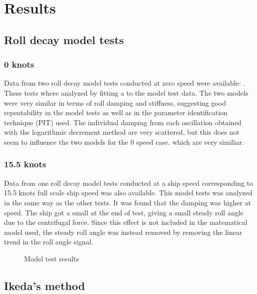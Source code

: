 \section{Results}\label{results}

    \subsection{Roll decay model tests}\label{roll-decay-model-tests}

\subsubsection{0 knots}\label{knots}

Data from two roll decay model tests conducted at zero speed were
available:
. These tests where analyzed by fitting a
 to the model test data. The two models were very similar in terms
of roll damping and stiffness, suggesting good repeatability in the
model tests as well as in the parameter identification technique (PIT)
used. The individual damping from each oscillation obtained with the
logarithmic decrement method are very scattered, but this does not seem
to influence the two models for the 0 speed case, which are very
similiar.

    \subsubsection{15.5 knots}\label{knots}

Data from one roll decay model tests conducted at a ship speed
corresponding to 15.5 knots full scale ship speed was also available.
This model tests was analyzed in the same way as the other tests. It was
found that the damping was higher at speed. The ship got a small
 at the end of test, giving a small steady roll angle due to the
centrifugal force. Since this effect is not included in the matematical
model used, the steady roll angle was instead removed by removing the
linear trend in the roll angle signal.

    \begin{figure}
        \begin{center}\end{center}
        \caption{Model test results}
        \label{fig:mdl}
    \end{figure}
    
    \subsection{Ikeda's method}\label{ikedas-method}

